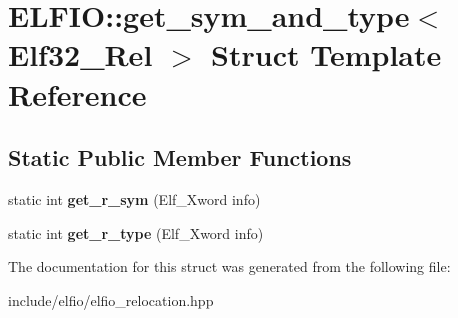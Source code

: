 \hypertarget{struct_e_l_f_i_o_1_1get__sym__and__type_3_01_elf32___rel_01_4}{}\section{E\+L\+F\+IO\+:\+:get\+\_\+sym\+\_\+and\+\_\+type$<$ Elf32\+\_\+\+Rel $>$ Struct Template Reference}
\label{struct_e_l_f_i_o_1_1get__sym__and__type_3_01_elf32___rel_01_4}
\subsection*{Static Public Member Functions}
\begin{DoxyCompactItemize}
\item 
static int {\bfseries get\+\_\+r\+\_\+sym} (Elf\+\_\+\+Xword info)\hypertarget{struct_e_l_f_i_o_1_1get__sym__and__type_3_01_elf32___rel_01_4_aa5d85f07cdd2aaee6657d53765e4696d}{}\label{struct_e_l_f_i_o_1_1get__sym__and__type_3_01_elf32___rel_01_4_aa5d85f07cdd2aaee6657d53765e4696d}

\item 
static int {\bfseries get\+\_\+r\+\_\+type} (Elf\+\_\+\+Xword info)\hypertarget{struct_e_l_f_i_o_1_1get__sym__and__type_3_01_elf32___rel_01_4_a6bf258dfab46e5ddff3694ba0f4fb412}{}\label{struct_e_l_f_i_o_1_1get__sym__and__type_3_01_elf32___rel_01_4_a6bf258dfab46e5ddff3694ba0f4fb412}

\end{DoxyCompactItemize}


The documentation for this struct was generated from the following file\+:\begin{DoxyCompactItemize}
\item 
include/elfio/elfio\+\_\+relocation.\+hpp\end{DoxyCompactItemize}
